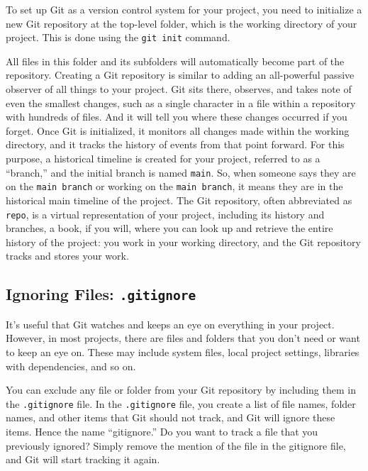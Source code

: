\documentclass[
  letterpaper,
  DIV=11,
  numbers=noendperiod]{scrreprt}
\begin{document}
To set up Git as a version control system for your project, you need to
initialize a new Git repository at the top-level folder, which is the
working directory of your project. This is done using the
\texttt{git\ init} command.

All files in this folder and its subfolders will automatically become
part of the repository. Creating a Git repository is similar to adding
an all-powerful passive observer of all things to your project. Git sits
there, observes, and takes note of even the smallest changes, such as a
single character in a file within a repository with hundreds of files.
And it will tell you where these changes occurred if you forget. Once
Git is initialized, it monitors all changes made within the working
directory, and it tracks the history of events from that point forward.
For this purpose, a historical timeline is created for your project,
referred to as a ``branch,'' and the initial branch is named
\texttt{main}. So, when someone says they are on the
\texttt{main\ branch} or working on the \texttt{main\ branch}, it means
they are in the historical main timeline of the project. The Git
repository, often abbreviated as \texttt{repo}, is a virtual
representation of your project, including its history and branches, a
book, if you will, where you can look up and retrieve the entire history
of the project: you work in your working directory, and the Git
repository tracks and stores your work.

\hypertarget{ignoring-files-.gitignore}{%
\subsection{\texorpdfstring{Ignoring Files:
\texttt{.gitignore}}{Ignoring Files: .gitignore}}\label{ignoring-files-.gitignore}}

It's useful that Git watches and keeps an eye on everything in your
project. However, in most projects, there are files and folders that you
don't need or want to keep an eye on. These may include system files,
local project settings, libraries with dependencies, and so on.

You can exclude any file or folder from your Git repository by including
them in the \texttt{.gitignore} file. In the \texttt{.gitignore} file,
you create a list of file names, folder names, and other items that Git
should not track, and Git will ignore these items. Hence the name
``gitignore.'' Do you want to track a file that you previously ignored?
Simply remove the mention of the file in the gitignore file, and Git
will start tracking it again.
\end{document}
